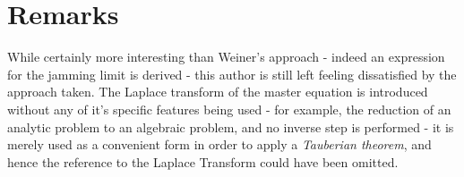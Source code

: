 \section{Remarks}

While certainly more interesting than Weiner's approach - indeed an expression for the 
jamming limit is derived - this author is still left feeling dissatisfied by the approach 
taken. The Laplace transform of the master equation is introduced without any of it's 
specific features being used - for example, the reduction of an analytic problem to an 
algebraic problem, and no inverse step is performed - it is merely used as a convenient 
form in order to apply a \emph{Tauberian theorem}, and hence the reference to the Laplace 
Transform could have been omitted. \bigskip











